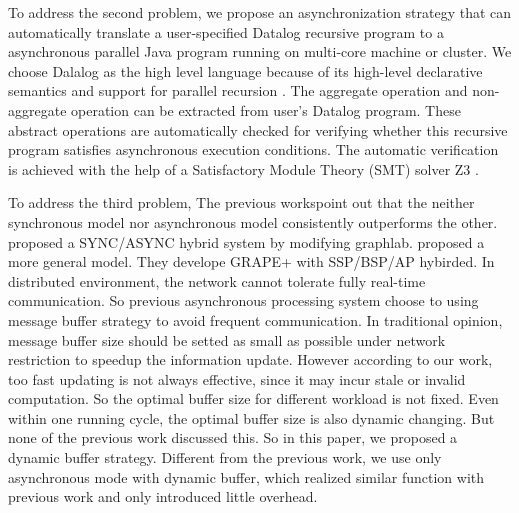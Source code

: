 To address the second problem, we propose an asynchronization strategy that can automatically translate a user-specified Datalog recursive program to a asynchronous parallel Java program running on multi-core machine or cluster. We choose Dalalog as the high level language because of its high-level declarative semantics and support for parallel recursion \cite{Shkapsky:2016:BDA:2882903.2915229}. The aggregate operation and non-aggregate operation can be extracted from user's Datalog program. These abstract operations are automatically checked for verifying whether this recursive program satisfies asynchronous execution conditions. The automatic verification is achieved with the help of a Satisfactory Module Theory (SMT) solver Z3 \cite{DeMoura:2008:ZES:1792734.1792766}.

{\color{red}
To address the third problem, The previous works\cite{Fan2018Adaptive,Xie2015SYNC}point out that the neither synchronous model nor asynchronous model consistently outperforms the other. \cite{Xie2015SYNC}proposed a SYNC/ASYNC hybrid system by modifying graphlab. \cite{Fan2018Adaptive} proposed a more general model. They develope GRAPE+ with SSP/BSP/AP hybirded.%
In distributed environment, the network cannot tolerate fully real-time communication. So previous asynchronous processing system choose to using message buffer strategy to avoid frequent communication. In traditional opinion, message buffer size should be setted as small as possible under network restriction to speedup the information update.  However according to our work, too fast updating is not always effective, since it may incur stale or invalid computation. So the optimal buffer size for different workload is not fixed. Even within one running cycle, the optimal buffer size is also dynamic changing. But none of the previous work discussed this. So in this paper, we proposed a dynamic buffer strategy. Different from the previous work, we use only asynchronous mode with dynamic buffer, which realized similar function with previous work and only introduced little overhead.  
}


